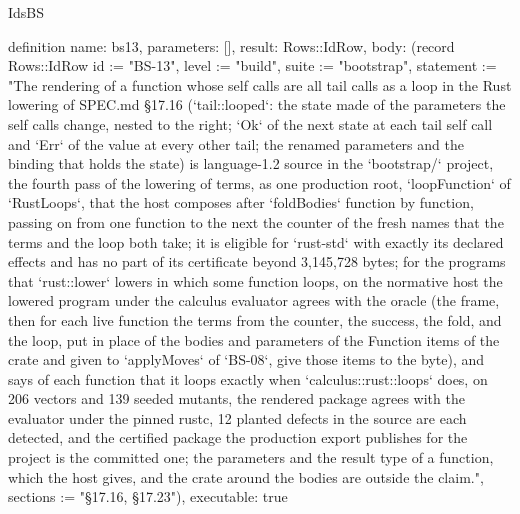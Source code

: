 \begin{lexlean}{IdsBS}
\begin{semanticmodule}
definition{
  name: bs13,
  parameters: [],
  result: Rows::IdRow,
  body: (record Rows::IdRow {id := "BS-13", level := "build", suite := "bootstrap", statement := "The rendering of a function whose self calls are all tail calls as a loop in the Rust lowering of SPEC.md §17.16 (`tail::looped`: the state made of the parameters the self calls change, nested to the right; `Ok` of the next state at each tail self call and `Err` of the value at every other tail; the renamed parameters and the binding that holds the state) is language-1.2 source in the `bootstrap/` project, the fourth pass of the lowering of terms, as one production root, `loopFunction` of `RustLoops`, that the host composes after `foldBodies` function by function, passing on from one function to the next the counter of the fresh names that the terms and the loop both take; it is eligible for `rust-std` with exactly its declared effects and has no part of its certificate beyond 3,145,728 bytes; for the programs that `rust::lower` lowers in which some function loops, on the normative host the lowered program under the calculus evaluator agrees with the oracle (the frame, then for each live function the terms from the counter, the success, the fold, and the loop, put in place of the bodies and parameters of the Function items of the crate and given to `applyMoves` of `BS-08`, give those items to the byte), and says of each function that it loops exactly when `calculus::rust::loops` does, on 206 vectors and 139 seeded mutants, the rendered package agrees with the evaluator under the pinned rustc, 12 planted defects in the source are each detected, and the certified package the production export publishes for the project is the committed one; the parameters and the result type of a function, which the host gives, and the crate around the bodies are outside the claim.", sections := "§17.16, §17.23"}),
  executable: true
}


\end{semanticmodule}
\end{lexlean}
